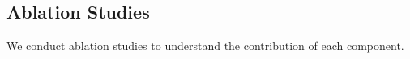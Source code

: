 


\subsection{Ablation Studies}

We conduct ablation studies to understand the contribution of each component.



